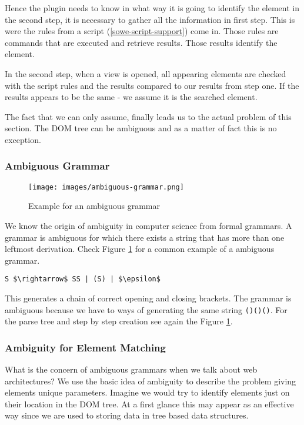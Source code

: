 Hence the plugin needs to know in what way it is going to identify the element in the second step, it is necessary to gather all the information in first step. This is were the rules from a script (\ref{sowe-script-support}) come in. Those rules are commands that are executed and retrieve results. Those results identify the element. 

In the second step, when a view is opened, all appearing elements are checked with the script rules and the results compared to our results from step one. If the results appears to be the same - we assume it is the searched element. 

The fact that we can only assume, finally leads us to the actual problem of this section. The DOM tree can be ambiguous and as a matter of fact this is no exception.

\subsubsection{Ambiguous Grammar}
\begin{figure}\centering
		\texttt{[image: images/ambiguous-grammar.png]}
		\caption{Example for an ambiguous grammar}
		\label{ambiguous-grammar-pic}
\end{figure} 

We know the origin of ambiguity in computer science from formal grammars. A grammar is ambiguous for which there exists a string that has more than one leftmost derivation. Check Figure \ref{ambiguous-grammar-pic} for a common example of a ambiguous grammar.
\begin{lstlisting}[mathescape]
S $\rightarrow$ SS | (S) | $\epsilon$
\end{lstlisting}
This generates a chain of correct opening and closing brackets. The grammar is ambiguous because we have to ways of generating the same string \verb^()()()^. For the parse tree and step by step creation see again the Figure \ref{ambiguous-grammar-pic}.

\subsubsection{Ambiguity for Element Matching}

What is the concern of ambiguous grammars when we talk about web architectures? We use the basic idea of ambiguity to describe the problem giving elements unique parameters. Imagine we would try to identify elements just on their location in the DOM tree. At a first glance this may appear as an effective way since we are used to storing data in tree based data structures. 

